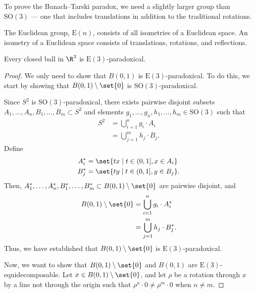 To prove the Banach--Tarski paradox, we need a slightly larger group than $\text{SO}(3)$ --- one that includes translations in addition to the traditional rotations.
\begin{definition}
  The {Euclidean group}, $\text{E}(n)$, consists of all isometries of a Euclidean space. An isometry of a Euclidean space consists of translations, rotations, and reflections.
\end{definition}
\begin{corollary}
  Every closed ball in $\R^3$ is $\text{E}(3)$-paradoxical.
\end{corollary}

\begin{proof}
  We only need to show that $B(0,1)$ is $\text{E}(3)$-paradoxical. To do this, we start by showing that $B(0,1)\setminus \set{0}$ is $\text{SO}(3)$-paradoxical.\newline

  Since $S^{2}$ is $\text{SO}(3)$-paradoxical, there exists pairwise disjoint subsets $A_1,\dots,A_n,B_1,\dots,B_m\subset S^2$ and elements $g_1,\dots,g_n,h_1,\dots,h_m\in \text{SO}(3)$ such that
  \begin{align*}
    S^{2} &= \bigcup_{i=1}^{n}g_i\cdot A_i\\
          &= \bigcup_{j=1}^{m}h_j\cdot B_j.
  \end{align*}
  Define
  \begin{align*}
    A_i^{\ast} &= \set{tx\mid t\in (0,1], x\in A_i}\\
    B_j^{\ast} &= \set{ty\mid t\in (0,1], y\in B_j}.
  \end{align*}
  Then, $A_1^{\ast},\dots,A_n^{\ast},B_1^{\ast},\dots,B_m^{\ast}\subset B(0,1)\setminus \set{0}$ are pairwise disjoint, and
  \begin{align*}
    B(0,1)\setminus \set{0} &= \bigcup_{i=1}^{n}g_i\cdot A_i^{\ast}\\
                            &= \bigcup_{j=1}^{m}h_j\cdot B_j^{\ast}.
  \end{align*}
  Thus, we have established that $B(0,1)\setminus \set{0}$ is $\text{E}(3)$-paradoxical.\newline

  Now, we want to show that $B(0,1)\setminus \set{0}$ and $B(0,1)$ are $\text{E}(3)$-equidecomposable. Let $x\in B(0,1)\setminus \set{0}$, and let $\rho$ be a rotation through $x$ by a line not through the origin such that $\rho^{n}\cdot 0\neq \rho^{m}\cdot 0$ when $n\neq m$.\newline


\end{proof}

